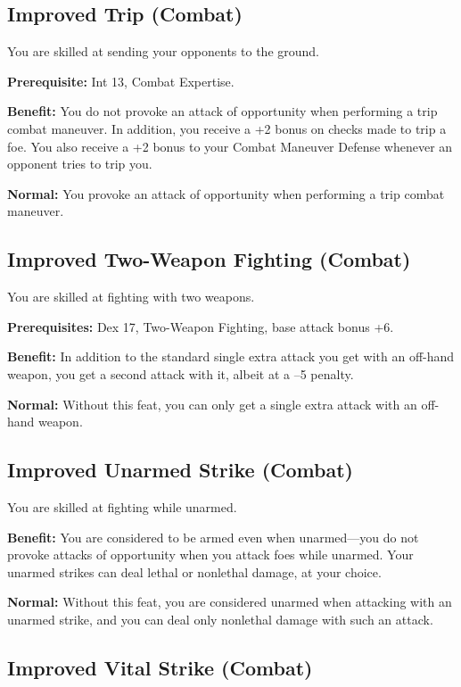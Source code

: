 \subsection{Improved Trip (Combat)}

				
You are skilled at sending your opponents to the ground.
				
\textbf{Prerequisite:} Int 13, Combat Expertise.
				
\textbf{Benefit:} You do not provoke an attack of opportunity when performing a trip combat maneuver. In addition, you receive a +2 bonus on checks made to trip a foe. You also receive a +2 bonus to your Combat Maneuver Defense whenever an opponent tries to trip you. 
				
\textbf{Normal:} You provoke an attack of opportunity when performing a trip combat maneuver.
				
\subsection{Improved Two-Weapon Fighting (Combat)}

				
You are skilled at fighting with two weapons.
				
\textbf{Prerequisites:} Dex 17, Two-Weapon Fighting, base attack bonus +6.
				
\textbf{Benefit:} In addition to the standard single extra attack you get with an off-hand weapon, you get a second attack with it, albeit at a --5 penalty.
				
\textbf{Normal:} Without this feat, you can only get a single extra attack with an off-hand weapon.
				
\subsection{Improved Unarmed Strike (Combat)}

				
You are skilled at fighting while unarmed.
				
\textbf{Benefit:} You are considered to be armed even when unarmed---you do not provoke attacks of opportunity when you attack foes while unarmed. Your unarmed strikes can deal lethal or nonlethal damage, at your choice.
				
\textbf{Normal:} Without this feat, you are considered unarmed when attacking with an unarmed strike, and you can deal only nonlethal damage with such an attack.
				
\subsection{Improved Vital Strike (Combat)}

